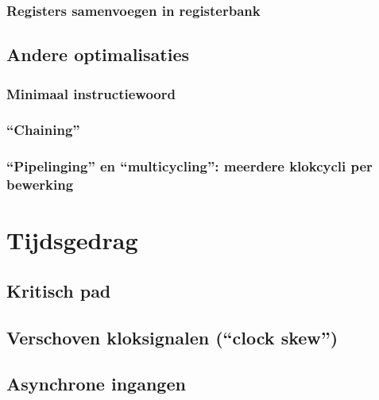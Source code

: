 \subsubsection{Registers samenvoegen in registerbank}
\subsection{Andere optimalisaties}
\label{ss:syntheseFSMDOptimal}
\subsubsection{Minimaal instructiewoord}
\subsubsection{``Chaining''}
\subsubsection{``Pipelinging'' en ``multicycling'': meerdere klokcycli per bewerking}
\section{Tijdsgedrag}
\label{s:timeFSMD}
\subsection{Kritisch pad}
\subsection{Verschoven kloksignalen (``clock skew'')}
\subsection{Asynchrone ingangen}
